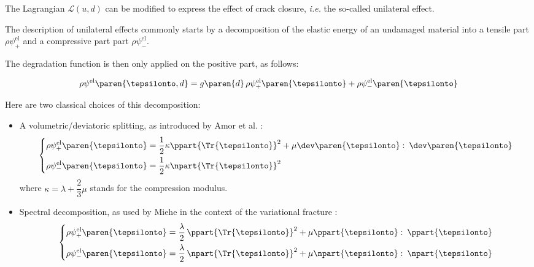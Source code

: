 The Lagrangian \(\mathcal{L}(u,d)\) can be modified to express the
effect of crack closure, \textit{i.e.} the so-called unilateral effect.

The description of unilateral effects commonly starts by a decomposition
of the elastic energy of an undamaged material into a tensile part
\(\rho\psi^{\mathrm{el}}_{+}\) and a compressive part part
\(\rho\psi^{\mathrm{el}}_{-}\).

The degradation function is then only applied on the positive part, as
follows:

\[
\rho\psi^{\mathrm{el}}\paren{\tepsilonto,d}=g\paren{d}\,\rho\psi^{\mathrm{el}}_{+}\paren{\tepsilonto}+\rho\psi^{\mathrm{el}}_{-}\paren{\tepsilonto}
\]

Here are two classical choices of this decomposition:

\begin{itemize}
    \item A volumetric/deviatoric splitting, as introduced by Amor et al.
    \cite{amor_regularized_2009}:
    \[
    \left\{
    \begin{aligned}
      \rho\psi^{\mathrm{el}}_{+}\paren{\tepsilonto} &= \dfrac{1}{2}\kappa \ppart{\Tr{\tepsilonto}}^2 + \mu
      \dev\paren{\tepsilonto}\,\colon\,\dev\paren{\tepsilonto}\\
      \rho\psi^{\mathrm{el}}_{-}\paren{\tepsilonto} &=
      \dfrac{1}{2}\kappa \npart{\Tr{\tepsilonto}}^2
    \end{aligned}
    \right.
    \]
    where $\kappa=\lambda+\dfrac{2}{3}\mu$ stands for the compression modulus.
    \item Spectral decomposition, as used by Miehe in the context of the
    variational fracture \cite{miehe_phase_2010}:
    \begin{equation}
        \label{eq:phase_field:spectral_decomposition}
        \left\{
        \begin{aligned}
        \rho\psi^{\mathrm{el}}_{+}\paren{\tepsilonto} &= \dfrac{\lambda}{2}\, 
        \ppart{\Tr{\tepsilonto}}^2 + \mu
        \ppart{\tepsilonto}\,\colon\,\ppart{\tepsilonto}\\
        \rho\psi^{\mathrm{el}}_{-}\paren{\tepsilonto} &= \dfrac{\lambda}{2}\, 
        \npart{\Tr{\tepsilonto}}^2 + \mu
        \npart{\tepsilonto}\,\colon\,\npart{\tepsilonto}\\
        \end{aligned}
        \right.
    \end{equation}
\end{itemize}

